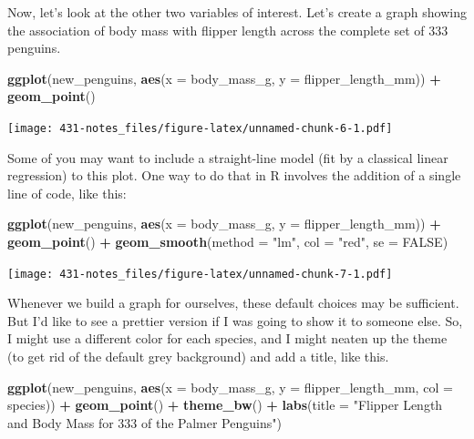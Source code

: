 \documentclass[
]{book}
\newenvironment{Shaded}{\begin{snugshade}}{\end{snugshade}}
\newcommand{\DataTypeTok}[1]{\textcolor[rgb]{0.13,0.29,0.53}{#1}}
\newcommand{\KeywordTok}[1]{\textcolor[rgb]{0.13,0.29,0.53}{\textbf{#1}}}
\newcommand{\NormalTok}[1]{#1}
\newcommand{\OperatorTok}[1]{\textcolor[rgb]{0.81,0.36,0.00}{\textbf{#1}}}
\newcommand{\OtherTok}[1]{\textcolor[rgb]{0.56,0.35,0.01}{#1}}
\newcommand{\StringTok}[1]{\textcolor[rgb]{0.31,0.60,0.02}{#1}}
\begin{document}
Now, let's look at the other two variables of interest. Let's create a graph showing the association of body mass with flipper length across the complete set of 333 penguins.

\begin{Shaded}
\begin{Highlighting}[]
\KeywordTok{ggplot}\NormalTok{(new_penguins, }\KeywordTok{aes}\NormalTok{(}\DataTypeTok{x =}\NormalTok{ body_mass_g, }\DataTypeTok{y =}\NormalTok{ flipper_length_mm)) }\OperatorTok{+}
\StringTok{    }\KeywordTok{geom_point}\NormalTok{() }
\end{Highlighting}
\end{Shaded}

\texttt{[image: 431-notes\_files/figure-latex/unnamed-chunk-6-1.pdf]}

Some of you may want to include a straight-line model (fit by a classical linear regression) to this plot. One way to do that in R involves the addition of a single line of code, like this:

\begin{Shaded}
\begin{Highlighting}[]
\KeywordTok{ggplot}\NormalTok{(new_penguins, }\KeywordTok{aes}\NormalTok{(}\DataTypeTok{x =}\NormalTok{ body_mass_g, }\DataTypeTok{y =}\NormalTok{ flipper_length_mm)) }\OperatorTok{+}
\StringTok{    }\KeywordTok{geom_point}\NormalTok{() }\OperatorTok{+}
\StringTok{    }\KeywordTok{geom_smooth}\NormalTok{(}\DataTypeTok{method =} \StringTok{"lm"}\NormalTok{, }\DataTypeTok{col =} \StringTok{"red"}\NormalTok{, }\DataTypeTok{se =} \OtherTok{FALSE}\NormalTok{)}
\end{Highlighting}
\end{Shaded}

\texttt{[image: 431-notes\_files/figure-latex/unnamed-chunk-7-1.pdf]}

Whenever we build a graph for ourselves, these default choices may be sufficient. But I'd like to see a prettier version if I was going to show it to someone else. So, I might use a different color for each species, and I might neaten up the theme (to get rid of the default grey background) and add a title, like this.

\begin{Shaded}
\begin{Highlighting}[]
\KeywordTok{ggplot}\NormalTok{(new_penguins, }\KeywordTok{aes}\NormalTok{(}\DataTypeTok{x =}\NormalTok{ body_mass_g, }\DataTypeTok{y =}\NormalTok{ flipper_length_mm, }\DataTypeTok{col =}\NormalTok{ species)) }\OperatorTok{+}
\StringTok{    }\KeywordTok{geom_point}\NormalTok{() }\OperatorTok{+}\StringTok{ }
\StringTok{    }\KeywordTok{theme_bw}\NormalTok{() }\OperatorTok{+}\StringTok{ }
\StringTok{    }\KeywordTok{labs}\NormalTok{(}\DataTypeTok{title =} \StringTok{"Flipper Length and Body Mass for 333 of the Palmer Penguins"}\NormalTok{)}
\end{Highlighting}
\end{Shaded}
\end{document}
